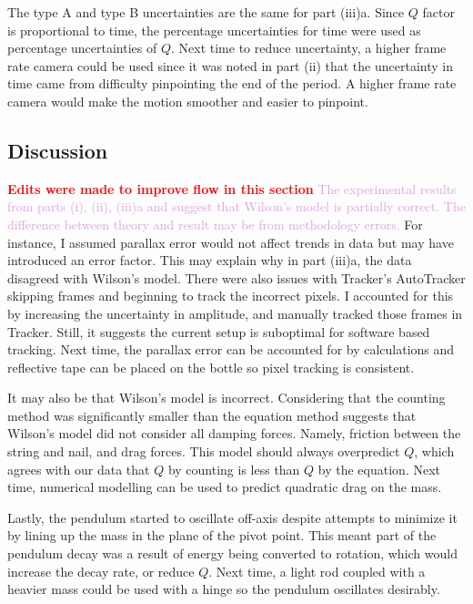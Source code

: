 \documentclass[notitlepage, twocolumn, 12pt]{article}
\begin{document}
    The type A and type B uncertainties are the same for part (iii)a. Since $Q$ factor is proportional to time, the percentage uncertainties for time were used as percentage uncertainties of $Q$. Next time to reduce uncertainty, a higher frame rate camera could be used since it was noted in part (ii) that the uncertainty in time came from difficulty pinpointing the end of the period. A higher frame rate camera would make the motion smoother and easier to pinpoint. 

    \color{Black}

    \subsection*{Discussion}
    \textcolor{Plum}{\textcolor{Red}{\textbf{Edits were made to improve flow in this section}} The experimental results from parts (i), (ii), (iii)a and suggest that Wilson's model is partially correct. The difference between theory and result may be from methodology errors.} For instance, I assumed parallax error would not affect trends in data but may have introduced an error factor. This may explain why in part (iii)a, the data disagreed with Wilson's model. There were also issues with Tracker's AutoTracker skipping frames and beginning to track the incorrect pixels. I accounted for this by increasing the uncertainty in amplitude, and manually tracked those frames in Tracker. Still, it suggests the current setup is suboptimal for software based tracking. Next time, the parallax error can be accounted for by calculations and reflective tape can be placed on the bottle so pixel tracking is consistent. 

    It may also be that Wilson's model is incorrect. Considering that the counting method was significantly smaller than the equation method suggests that Wilson's model did not consider all damping forces. Namely, friction between the string and nail, and drag forces. This model should always overpredict $Q$, which agrees with our data that $Q$ by counting is less than $Q$ by the equation. Next time, numerical modelling can be used to predict quadratic drag on the mass.

    Lastly, the pendulum started to oscillate off-axis despite attempts to minimize it by lining up the mass in the plane of the pivot point. This meant part of the pendulum decay was a result of energy being converted to rotation, which would increase the decay rate, or reduce $Q$. Next time, a light rod coupled with a heavier mass could be used with a hinge so the pendulum oscillates desirably.
\end{document}
